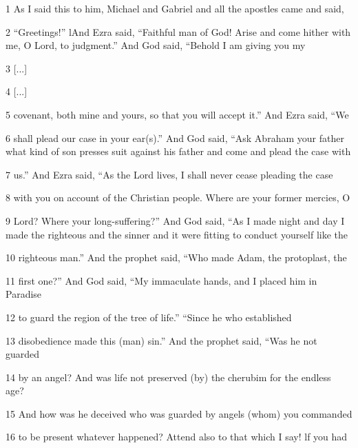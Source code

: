 \par 1 As I said this to him, Michael and Gabriel and all the apostles came and said,

\par 2 “Greetings!” lAnd Ezra said, “Faithful man of God! Arise and come hither with me, O Lord, to judgment.” And God said, “Behold I am giving you my

\par 3 [...]

\par 4 [...]

\par 5 covenant, both mine and yours, so that you will accept it.” And Ezra said, “We

\par 6 shall plead our case in your ear(s).” And God said, “Ask Abraham your father what kind of son presses suit against his father and come and plead the case with

\par 7 us.” And Ezra said, “As the Lord lives, I shall never cease pleading the case

\par 8 with you on account of the Christian people. Where are your former mercies, O

\par 9 Lord? Where your long-suffering?” And God said, “As I made night and day I made the righteous and the sinner and it were fitting to conduct yourself like the

\par 10 righteous man.” And the prophet said, “Who made Adam, the protoplast, the

\par 11 first one?” And God said, “My immaculate hands, and I placed him in Paradise

\par 12 to guard the region of the tree of life.” “Since he who established

\par 13 disobedience made this (man) sin.” And the prophet said, “Was he not guarded

\par 14 by an angel? And was life not preserved (by) the cherubim for the endless age?

\par 15 And how was he deceived who was guarded by angels (whom) you commanded

\par 16 to be present whatever happened? Attend also to that which I say! lf you had

